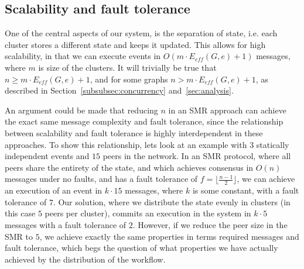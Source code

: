 \documentclass{article}
\begin{document}
	\subsection{Scalability and fault tolerance}

    One of the central aspects of our system, is the separation of state, i.e. each cluster stores a different state and keeps it updated.
   	This allows for high scalability, in that we can execute events in $O(m \cdot E_{eff}(G,e) + 1)$ messages, where $m$ is size of the clusters.
   	It will trivially be true that $n \geq m \cdot E_{eff}(G,e) + 1$, and for some graphs $n > m \cdot E_{eff}(G,e) + 1$, as described in Section~\ref{subsubsec:concurrency} and~\ref{sec:analysis}.

    An argument could be made that reducing $n$ in an SMR approach can achieve the exact same message complexity and fault tolerance, since the relationship between scalability and fault tolerance is highly interdependent in these approaches.
    To show this relationship, lets look at an example with $3$ statically independent events and $15$ peers in the network.
    In an SMR protocol, where all peers share the entirety of the state, and which achieves consensus in $O(n)$ messages under no faults, and has a fault tolerance of $f = \lfloor \frac{n-1}{2} \rfloor$, we can achieve an execution of an event in $k \cdot 15$ messages, where $k$ is some constant, with a fault tolerance of $7$.
    Our solution, where we distribute the state evenly in clusters (in this case $5$ peers per cluster), commits an execution in the system in $k \cdot 5$ messages with a fault tolerance of $2$.
    However, if we reduce the peer size in the SMR to $5$, we achieve exactly the same properties in terms required messages and fault tolerance, which begs the question of what properties we have actually achieved by the distribution of the workflow.
\end{document}
